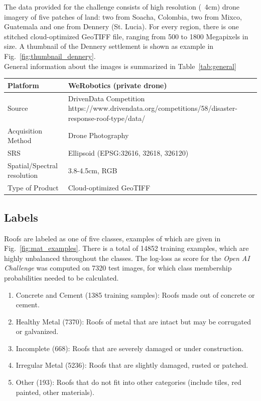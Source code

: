 \documentclass[11pt]{article}
\begin{document}
	The data provided for the challenge consists of high resolution (~4cm) drone imagery of five patches of land: two from Soacha, Colombia, two from Mixco, Guatemala and one from Dennery (St. Lucia).
	For every region, there is one stitched cloud-optimized GeoTIFF file, ranging from 500 to 1800 Megapixels in size. A thumbnail of the Dennery settlement is shown as example in Fig.~\ref{fig:thumbnail_dennery}.\\
	General information about the images is summarized in Table~\ref{tab:general}

	\begin{center}
		\bgroup
		\def\arraystretch{1.1}
		\begin{tabular}{ | m{5cm} | m{10cm}|} 
			\hline
			Platform & WeRobotics (private drone)  \\ 
			\hline
			Source & DrivenData Competition \newline https://www.drivendata.org/competitions/58/disaster-response-roof-type/data/ \\ 
			\hline
			Acquisition Method & Drone Photography  \\ 
			\hline
			SRS  & Ellipsoid (EPSG:32616, 32618, 326120)  \\ 
			\hline
			Spatial/Spectral resolution & 3.8-4.5cm, RGB  \\ 
			\hline
			Type of Product & Cloud-optimized GeoTIFF \\ 
			\hline
		\end{tabular}
		\egroup		
		\label{tab:general}
	\end{center}
	
	\subsection{Labels}
	
	Roofs are labeled as one of five classes, examples of which are given in Fig.~\ref{fig:mat_examples}. There is a total of 14852 training examples, which are highly unbalanced throughout the classes.
	The log-loss as score for the \textit{Open AI Challenge} was computed on 7320 test images, for which class membership probabilities needed to be calculated.
	
	\begin{enumerate}
		\itemsep0em
		\item Concrete and Cement (1385 training samples): Roofs made out of concrete or cement.
		\item Healthy Metal (7370): Roofs of metal that are intact but may be corrugated or galvanized.
		\item Incomplete (668): Roofs that are severely damaged or under construction.
		\item Irregular Metal (5236): Roofs that are slightly damaged, rusted or patched.
		\item Other (193): Roofs that do not fit into other categories (include tiles, red painted, other materials).
	\end{enumerate}
\end{document}
